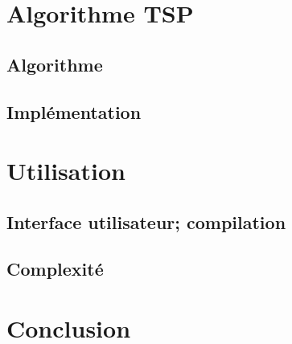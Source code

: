 \documentclass{article}
\begin{document}
\section{Algorithme TSP}

\subsection{Algorithme}

\subsection{Implémentation}

\section{Utilisation}

\subsection{Interface utilisateur; compilation}

\subsection{Complexité}

\section*{Conclusion}



\end{document}
